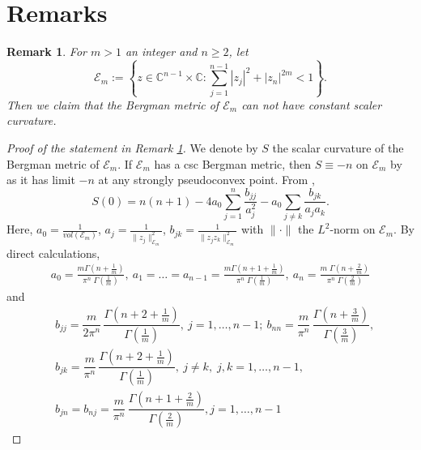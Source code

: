 \documentclass[a4paper,centertags,osxzneside,12pt]{amsart}
\newtheorem{remark}[theorem]{Remark}
\numberwithin{equation}{section}
\begin{document}
\section{Remarks}

\begin{remark}\label{rem1}
    For $m>1$ an integer  and $n\geq 2$, let $$\mathcal E_m:=\left\{z\in\mathbb C^{n-1}\times \mathbb C:\sum_{j=1}^{n-1}|z_j|^2+|z_n|^{2m}<1\right\}.$$ Then we claim that the Bergman metric of $\mathcal E_m$ can not have constant scaler curvature.
\end{remark}
\begin{proof}[Proof of the statement in Remark \ref{rem1}]
    We denote by  $S$  the scalar curvature of the Bergman metric of $\mathcal E_m$. If $\mathcal E_m$ has a csc Bergman metric, then $S\equiv -n$ on $\mathcal E_m$ by \cite[Corollary 2]{KYu96} as it has limit $-n$ at any strongly pseudoconvex point. From \cite {KYu96}, 
    \begin{equation}\label{scaler}
    S(0)=n(n+1)-4a_0\sum_{j=1}^n\frac{b_{jj}}{a_j^2}-a_0\sum_{j\neq k}\frac{b_{jk}}{a_ja_k}.
    \end{equation}
    Here, $a_0=\frac{1}{vol(\mathcal E_m)}$, $a_j=\frac{1}{\|z_j\|_{\mathcal E_m}^2}$, $b_{jk}=\frac{1}{\|z_jz_k\|^2_{\mathcal E_m}}$ with $\|\cdot\|$ the $L^2$-norm on $\mathcal E_m$.
    By direct calculations, 
    \begin{equation}\label{5-28-a1}
\begin{aligned}
a_0=\frac{m\Gamma\!\left(n + \frac{1}{m}\right)}{\pi^{n} \; \Gamma\!\left(\frac{1}{m}\right)},~
a_1=\dots=a_{n-1}=\frac{m\Gamma\!\left(n +1+ \frac{1}{m}\right)}{\pi^{n} \; \Gamma\!\left(\frac{1}{m}\right)},~ 
a_n=\frac{m\;\Gamma\!\left(n+\frac{2}{m}\right)}{\pi^{n} \; \Gamma\!\left(\frac{2}{m}\right)}
\end{aligned}
\end{equation}
and 
\begin{equation}\label{5-28-a2}
\begin{split}
&b_{jj}=\dfrac{m}{2\pi^n}\,\dfrac{\Gamma\!\left(n+2+\frac1m\right)}{\Gamma\!\left(\frac1m\right)},~ j=1,\dots,n-1; ~b_{nn}=\dfrac{m}{\pi^n}\,\dfrac{\Gamma\!\left(n+\frac3m\right)}{\Gamma\!\left(\frac3m\right)},\\
&b_{jk}=\dfrac{m}{\pi^n}\,\dfrac{\Gamma\!\left(n+2+\frac1m\right)}{\Gamma\!\left(\frac1m\right)},~  j\neq k,\; j,k=1,\dots,n-1,\\
&b_{jn}=b_{nj}=\dfrac{m}{\pi^n}\,\dfrac{\Gamma\!\left(n+1+\frac2m\right)}{\Gamma\!\left(\frac2m\right)},  j=1,\dots,n-1

\end{split}
\end{equation}
\end{proof}
\end{document}

